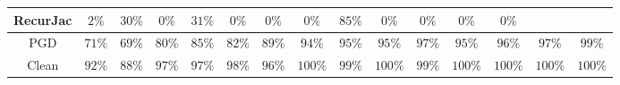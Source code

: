 \begin{table*}
{\begin{tabular}{c|c|c|c|c|c|c|c|c|c|c|c|c|c|c}
     RecurJac &         $2\%$ &        $30\%$ &         $0\%$ &        $31\%$ &         $0\%$ &         $0\%$ &         $0\%$ &        $85\%$ &         $0\%$ &         $0\%$ &         $0\%$ &         $0\%$ &               &               \\
\hline
          PGD &        $71\%$ &        $69\%$ &        $80\%$ &        $85\%$ &        $82\%$ &        $89\%$ &        $94\%$ &        $95\%$ &        $95\%$ &        $97\%$ &        $95\%$ &        $96\%$ &        $97\%$ &        $99\%$ \\
\hline
        Clean &        $92\%$ &        $88\%$ &        $97\%$ &        $97\%$ &        $98\%$ &        $96\%$ &       $100\%$ &        $99\%$ &       $100\%$ &        $99\%$ &       $100\%$ &       $100\%$ &       $100\%$ &       $100\%$ \\

    \bottomrule
    \end{tabular}
    }
    \label{table:exp-A-robust-accuracy-mnist-1}
\end{table*}
    

